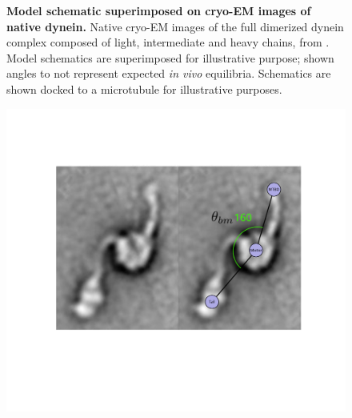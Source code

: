 \documentclass[9pt,twocolumn,twoside,lineno]{pnas-new}
\begin{document}
\begin{figure}
\begin{minipage}{.3\textwidth}
   \label{fig:explengths}
 \end{minipage}
\caption{\textbf{Model schematic superimposed on cryo-EM images of native dynein.} Native cryo-EM images of the full dimerized dynein complex composed of light, intermediate and heavy chains, from \cite{nativestructure}. Model schematics are superimposed for illustrative purpose; shown angles to not represent expected \textit{in vivo} equilibria. Schematics are shown docked to a microtubule for illustrative purposes.}
\label{fig:modelparams}
\end{figure}

\begin{figure}%
\centering
 \begin{minipage}{0.5\textwidth}
   \centering
   \includegraphics[width=\linewidth]{figures/schematic-prestroke}
   \label{fig:prestrokeangle}
 \end{minipage}%
 \begin{minipage}{0.5\textwidth}
   \centering

\end{minipage}
\end{figure}
\end{document}
